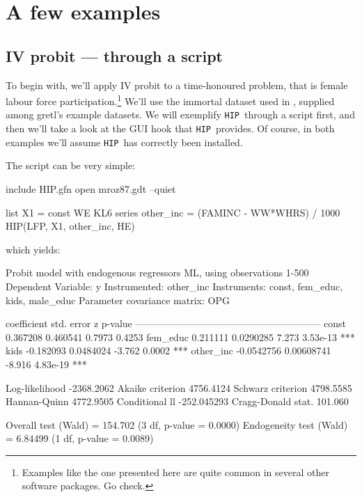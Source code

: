 \documentclass[a4paper,10pt]{article}
\newcommand{\app}[1]{\textsf{#1}}
\newcounter{script}[section]
\newcommand{\HIP}{\texttt{HIP}}
\begin{document}
\section{A few examples}

\subsection{IV probit --- through a script}

To begin with, we'll apply IV probit to a time-honoured problem, that
is female labour force participation.\footnote{Examples like the one
  presented here are quite common in several other software
  packages. Go check.} We'll use the immortal dataset used in
\cite{Mroz87}, supplied among \app{gretl}'s example datasets. We will
exemplify \HIP\ through a script first, and then we'll take a look
at the GUI hook that \HIP\ provides. Of course, in both examples we'll
assume \HIP\ has correctly been installed.

The script can be very simple:

\begin{code}
include HIP.gfn
open mroz87.gdt --quiet

list X1 = const WE KL6
series other_inc = (FAMINC - WW*WHRS) / 1000
HIP(LFP, X1, other_inc, HE)
\end{code}

which yields:

\begin{code}
Probit model with endogenous regressors
ML, using observations 1-500
Dependent Variable: y 
Instrumented: other_inc
Instruments: const, fem_educ, kids, male_educ 
Parameter covariance matrix: OPG

              coefficient   std. error      z      p-value 
  ---------------------------------------------------------
  const        0.367208     0.460541      0.7973   0.4253  
  fem_educ     0.211111     0.0290285     7.273    3.53e-13 ***
  kids        -0.182093     0.0484024    -3.762    0.0002   ***
  other_inc   -0.0542756    0.00608741   -8.916    4.83e-19 ***

Log-likelihood       -2368.2062  Akaike criterion    4756.4124
Schwarz criterion     4798.5585  Hannan-Quinn        4772.9505
Conditional ll      -252.045293  Cragg-Donald stat.    101.060

Overall test (Wald) = 154.702 (3 df, p-value = 0.0000)
Endogeneity test (Wald) = 6.84499 (1 df, p-value = 0.0089)
\end{code}
\end{document}
